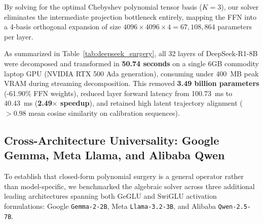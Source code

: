 \documentclass[journal,lettersize]{IEEEtran}
\begin{document}
By solving for the optimal Chebyshev polynomial tensor basis ($K=3$), our solver eliminates the intermediate projection bottleneck entirely, mapping the FFN into a 4-basis orthogonal expansion of size $4096 \times 4096 \times 4 = 67,108,864$ parameters per layer.

\begin{table}[h]
\centering
\caption{Frontier Weight Surgery: DeepSeek-R1-Distill-Llama-8B (32 Layers)}
\label{tab:deepseek_surgery}
\end{table}

As summarized in Table~\ref{tab:deepseek_surgery}, all 32 layers of DeepSeek-R1-8B were decomposed and transformed in \textbf{50.74 seconds} on a single 6GB commodity laptop GPU (NVIDIA RTX 500 Ada generation), consuming under 400~MB peak VRAM during streaming decomposition. This removed \textbf{3.49 billion parameters} (-61.90\% FFN weights), reduced layer forward latency from 100.73~ms to 40.43~ms (\textbf{2.49$\times$ speedup}), and retained high latent trajectory alignment ($>0.98$ mean cosine similarity on calibration sequences).

\subsection{Cross-Architecture Universality: Google Gemma, Meta Llama, and Alibaba Qwen}
To establish that closed-form polynomial surgery is a general operator rather than model-specific, we benchmarked the algebraic solver across three additional leading architectures spanning both GeGLU and SwiGLU activation formulations: Google \texttt{Gemma-2-2B}, Meta \texttt{Llama-3.2-3B}, and Alibaba \texttt{Qwen-2.5-7B}.
\end{document}
